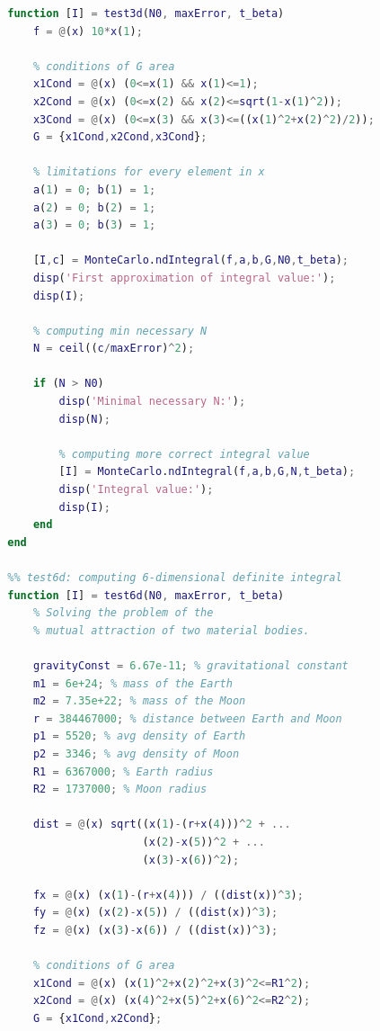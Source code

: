 \documentclass[a4paper,12pt]{article}
\begin{document}
\begin{lstlisting}[language=MATLAB]
        %% test3d: computing 3-dimensional definite integral
        function [I] = test3d(N0, maxError, t_beta)
            f = @(x) 10*x(1);
            
            % conditions of G area
            x1Cond = @(x) (0<=x(1) && x(1)<=1);
            x2Cond = @(x) (0<=x(2) && x(2)<=sqrt(1-x(1)^2));
            x3Cond = @(x) (0<=x(3) && x(3)<=((x(1)^2+x(2)^2)/2));
            G = {x1Cond,x2Cond,x3Cond};
            
            % limitations for every element in x
            a(1) = 0; b(1) = 1;
            a(2) = 0; b(2) = 1;
            a(3) = 0; b(3) = 1;
            
            [I,c] = MonteCarlo.ndIntegral(f,a,b,G,N0,t_beta);
            disp('First approximation of integral value:');
            disp(I);
            
            % computing min necessary N
            N = ceil((c/maxError)^2);
            
            if (N > N0)
                disp('Minimal necessary N:');
                disp(N);

                % computing more correct integral value
                [I] = MonteCarlo.ndIntegral(f,a,b,G,N,t_beta);
                disp('Integral value:');
                disp(I);
            end
        end

        %% test6d: computing 6-dimensional definite integral
        function [I] = test6d(N0, maxError, t_beta)
            % Solving the problem of the 
            % mutual attraction of two material bodies.
            
            gravityConst = 6.67e-11; % gravitational constant
            m1 = 6e+24; % mass of the Earth
            m2 = 7.35e+22; % mass of the Moon
            r = 384467000; % distance between Earth and Moon
            p1 = 5520; % avg density of Earth
            p2 = 3346; % avg density of Moon
            R1 = 6367000; % Earth radius
            R2 = 1737000; % Moon radius
            
            dist = @(x) sqrt((x(1)-(r+x(4)))^2 + ...
                             (x(2)-x(5))^2 + ...
                             (x(3)-x(6))^2);
            
            fx = @(x) (x(1)-(r+x(4))) / ((dist(x))^3);
            fy = @(x) (x(2)-x(5)) / ((dist(x))^3);
            fz = @(x) (x(3)-x(6)) / ((dist(x))^3);
            
            % conditions of G area
            x1Cond = @(x) (x(1)^2+x(2)^2+x(3)^2<=R1^2);
            x2Cond = @(x) (x(4)^2+x(5)^2+x(6)^2<=R2^2);
            G = {x1Cond,x2Cond};
            

\end{lstlisting}
\end{document}
